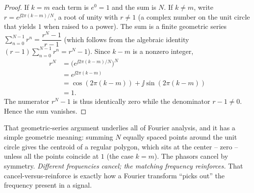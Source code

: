 \begin{proof}
If $k=m$ each term is $e^0=1$ and the sum is $N$. If $k\neq m$, write $r=e^{\jj 2\pi(k-m)/N}$, a
root of unity with $r\neq 1$ (a complex number on the unit circle that yields $1$ when raised to a power). The sum is a finite geometric series
$\sum_{n=0}^{N-1} r^n = \dfrac{r^N-1}{r-1}$ (which follows from the algebraic identity
$(r-1)\sum_{n=0}^{N-1} r^n = r^N - 1$). Since $k-m$ is a nonzero integer,
\begin{align*}
  r^N &= \big(e^{\jj 2\pi(k-m)/N}\big)^N \\
  &= e^{\jj 2\pi(k-m)} \\
  &= \cos(2\pi(k-m)) + \jj\sin(2\pi(k-m)) \\
  &= 1 .
\end{align*}
The numerator $r^N - 1$ is thus identically zero while the denominator $r-1 \neq 0$.
Hence the sum vanishes.
\end{proof}

\begin{happeningbox}
That geometric-series argument underlies all of Fourier analysis, and it has a
simple geometric meaning: summing $N$ equally spaced points around the unit circle gives the centroid of a
regular polygon, which sits at the center -- zero -- unless all the points coincide at $1$ (the case
$k=m$). The phasors cancel by symmetry. \emph{Different frequencies cancel; the matching frequency
reinforces.} That cancel-versus-reinforce is exactly how a Fourier transform ``picks out'' the
frequency present in a signal.
\end{happeningbox}

